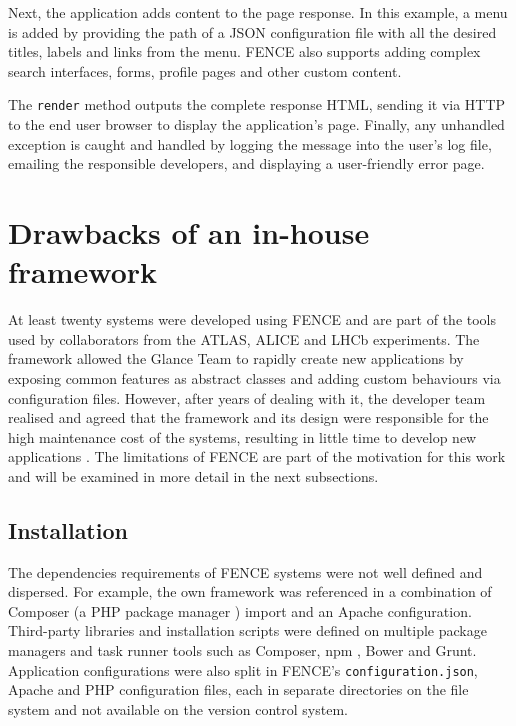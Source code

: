 Next, the application adds content to the page response. In this example, a menu is added by providing the path of a JSON configuration file with all the desired titles, labels and links from the menu. FENCE also supports adding complex search interfaces, forms, profile pages and other custom content.

The \texttt{render} method outputs the complete response HTML, sending it via HTTP to the end user browser to display the application's page. Finally, any unhandled exception is caught and handled by logging the message into the user's log file, emailing the responsible developers, and displaying a user-friendly error page.

\section{Drawbacks of an in-house framework}

At least twenty systems were developed using FENCE \cite{pinhao-tcc} and are part of the tools used by collaborators from the ATLAS, ALICE and LHCb experiments. The framework allowed the Glance Team to rapidly create new applications by exposing common features as abstract classes and adding custom behaviours via configuration files. However, after years of dealing with it, the developer team realised and agreed that the framework and its design were responsible for the high maintenance cost of the systems, resulting in little time to develop new applications \cite{de-jesus-tcc}. The limitations of FENCE are part of the motivation for this work and will be examined in more detail in the next subsections. 

\subsection{Installation}

The dependencies requirements of FENCE systems were not well defined and dispersed. For example, the own framework was referenced in a combination of Composer (a PHP package manager \cite{composer-website}) import and an Apache configuration. Third-party libraries and installation scripts were defined on multiple package managers and task runner tools such as Composer, npm \cite{npm-website}, Bower \cite{bower-website} and Grunt\cite{grunt-website}. Application configurations were also split in FENCE's \texttt{configuration.json}, Apache and PHP configuration files, each in separate directories on the file system and not available on the version control system.

